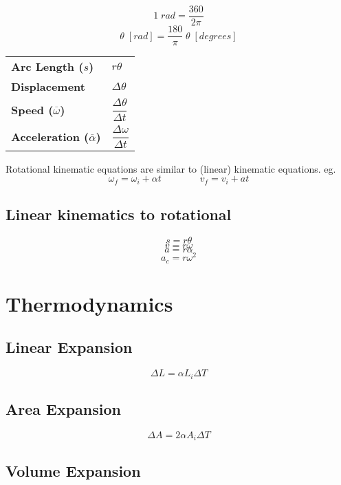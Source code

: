 \documentclass[12pt, twocolumn]{article}
\begin{document}
\begin{spacing}{1.5}
$$1 \; rad = \frac{360}{2 \pi}$$
$$\theta \; [rad] = \frac{180}{\pi} \; \theta \; [degrees]$$

\vspace{0.5cm}

\begin{tabular}{p{3.5cm}  p{2cm}}

\textbf{Arc Length ($s$)} & $r \theta$ \\[0.1cm]

\textbf{Displacement} & $\Delta \theta$ \\[0.3cm]

\textbf{Speed ($\overline{\omega}$)} & $\dfrac{\Delta \theta}{\Delta t}$ \\[0.5cm]

\textbf{Acceleration ($\overline{\alpha}$)} & $\dfrac{\Delta \omega}{\Delta t}$ \\[0.3cm]

\end{tabular}

\vspace{0.5cm}

Rotational kinematic equations are similar to (linear) kinematic equations. eg. 
$$\omega_f = \omega_i + \alpha t \qquad \qquad 
v_f = v_i + at$$

\subsection{Linear kinematics to rotational}

$$s = r \theta$$
$$v = r \omega$$
$$a = r \alpha$$
$$a_c = r \omega^2$$

\section{Thermodynamics}

\subsection{Linear Expansion}

$$\Delta L = \alpha L_i \Delta T$$

\subsection{Area Expansion}

$$\Delta A = 2\alpha A_i \Delta T$$

\subsection{Volume Expansion}


\end{spacing}
\end{document}
